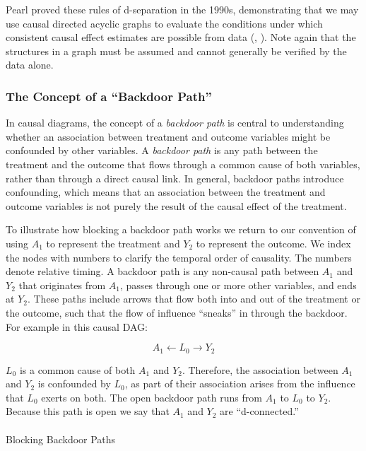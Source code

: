 \documentclass[
  singlecolumn]{article}
\makeatletter
\let\oldparagraph\paragraph
\renewcommand{\paragraph}{
    \@ifstar
      \xxxParagraphStar
      \xxxParagraphNoStar
  }
\newcommand{\xxxParagraphStar}[1]{\oldparagraph*{#1}\mbox{}}
\newcommand{\xxxParagraphNoStar}[1]{\oldparagraph{#1}\mbox{}}
\makeatother
\begin{document}
Pearl proved these rules of d-separation in the 1990s, demonstrating
that we may use causal directed acyclic graphs to evaluate the
conditions under which consistent causal effect estimates are possible
from data (,
). Note again that the structures in a
graph must be assumed and cannot generally be verified by the data
alone.

\subsubsection{The Concept of a ``Backdoor
Path''}\label{the-concept-of-a-backdoor-path}

In causal diagrams, the concept of a \emph{backdoor path} is central to
understanding whether an association between treatment and outcome
variables might be confounded by other variables. A \emph{backdoor path}
is any path between the treatment and the outcome that flows through a
common cause of both variables, rather than through a direct causal
link. In general, backdoor paths introduce confounding, which means that
an association between the treatment and outcome variables is not purely
the result of the causal effect of the treatment.

To illustrate how blocking a backdoor path works we return to our
convention of using \(A_1\) to represent the treatment and \(Y_2\) to
represent the outcome. We index the nodes with numbers to clarify the
temporal order of causality. The numbers denote relative timing. A
backdoor path is any non-causal path between \(A_1\) and \(Y_2\) that
originates from \(A_1\), passes through one or more other variables, and
ends at \(Y_2\). These paths include arrows that flow both into and out
of the treatment or the outcome, such that the flow of influence
``sneaks'' in through the backdoor. For example in this causal DAG:

\[
A_1 \leftarrow L_0 \rightarrow Y_2
\]

\(L_0\) is a common cause of both \(A_1\) and \(Y_2\). Therefore, the
association between \(A_1\) and \(Y_2\) is confounded by \(L_0\), as
part of their association arises from the influence that \(L_0\) exerts
on both. The open backdoor path runs from \(A_1\) to \(L_0\) to \(Y_2\).
Because this path is open we say that \(A_1\) and \(Y_2\) are
``d-connected.''

\paragraph{Blocking Backdoor Paths}\label{blocking-backdoor-paths}
\end{document}
